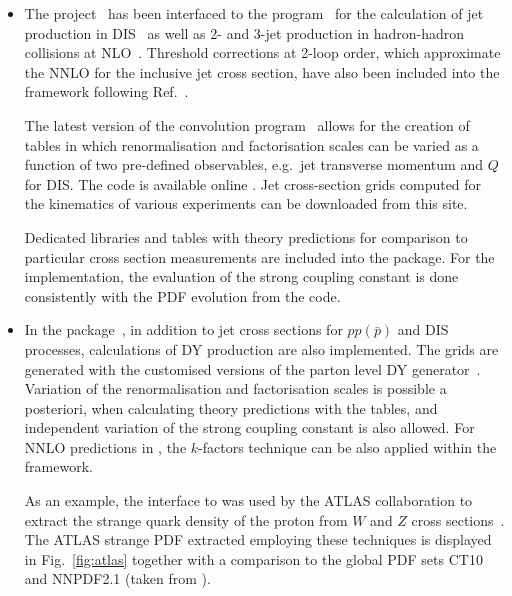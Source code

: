 \begin{itemize}
  \item The \fastnlo project~\cite{Kluge:2006xs} has been interfaced
    to the \nlojetpp program~\cite{Nagy:1998bb} for the calculation of
    jet production in DIS~\cite{Nagy:2001xb} as well as 2- and 3-jet
    production in hadron-hadron collisions at
    NLO~\cite{Nagy:2003tz,Nagy:2001fj}.  Threshold corrections at 2-loop
    order, which approximate the NNLO for the inclusive jet cross
    section, have also been included into the framework \cite{Wobisch:2011ij} 
    following Ref.~\cite{Kidonakis:2000gi}.
  
    The latest version of the \fastnlo convolution program~\cite{Britzger:2012bs} allows for the
    creation of tables in which renormalisation and factorisation scales
    can be varied as a function of two pre-defined observables, e.g.\ jet
    transverse momentum \pperp and $Q$ for DIS\@. 
    The \fastnlo code is available online \cite{fastNLO:HepForge}.
    Jet cross-section grids computed for the kinematics of various experiments
    can be downloaded from this site.

    Dedicated \fastnlo libraries and tables with theory predictions  for comparison to
    particular cross section measurements are included into the \fitter package. 
    For the \fitter implementation, the evaluation of the strong coupling constant is done
    consistently with the PDF evolution from the \qcdnum code. 

\item In the \applgrid package~\cite{Carli:2010rw,APPLGRID:HepForge},
    in addition to jet cross sections for
    $pp(\bar p)$ and DIS processes, calculations 
    of DY production are also implemented. The grids are generated with
    the customised versions of the \mcfm parton level DY
    generator~\cite{Campbell:1999ah,Campbell:2000je,Campbell:2010ff}.
    Variation of the renormalisation and factorisation scales is possible a posteriori,
    when calculating theory predictions with the \applgrid  tables, and
    independent variation of the strong coupling constant is also allowed.
    For NNLO predictions in \fitter, the $k$-factors technique can be also applied
    within the \applgrid framework.

    As an example, the \fitter interface to \applgrid was used by the ATLAS
    collaboration to extract the strange quark density of the proton
    from $W$ and $Z$ cross sections~\cite{atlas:strange}. The 
   ATLAS strange PDF extracted employing these techniques
    is displayed in
    Fig.~\ref{fig:atlas} together with a comparison to the global PDF
    sets CT10~\cite{CT10pdf} and NNPDF2.1 \cite{NNPDFpdf} (taken from \cite{atlas:strange}).


\end{itemize}
